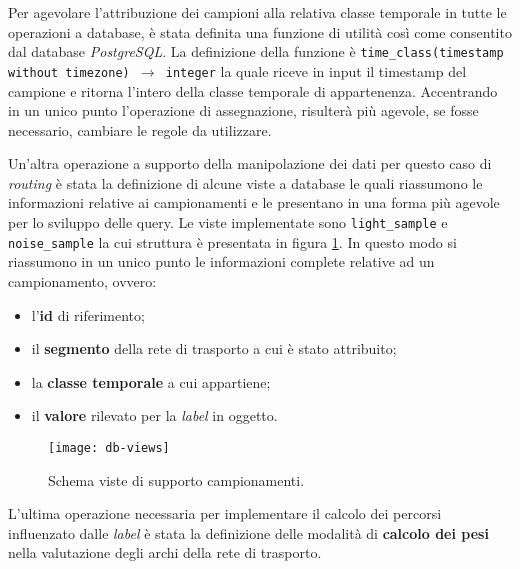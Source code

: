 Per agevolare l'attribuzione dei campioni alla relativa classe temporale in tutte le operazioni a database, è stata definita una funzione di utilità così come consentito dal database \emph{PostgreSQL}. La definizione della funzione è \texttt{time\_class(timestamp without timezone) $\rightarrow$ integer} la quale riceve in input il timestamp del campione e ritorna l'intero della classe temporale di appartenenza. Accentrando in un unico punto l'operazione di assegnazione, risulterà più agevole, se fosse necessario, cambiare le regole da utilizzare. 

Un'altra operazione a supporto della manipolazione dei dati per questo caso di \emph{routing} è stata la definizione di alcune viste a database le quali riassumono le informazioni relative ai campionamenti e le presentano in una forma più agevole per lo sviluppo delle query. Le viste implementate sono \texttt{light\_sample} e \texttt{noise\_sample} la cui struttura è presentata in figura \ref{fig:db-views}. In questo modo si riassumono in un unico punto le informazioni complete relative ad un campionamento, ovvero:
\begin{itemize}
\item l'\textbf{id} di riferimento;
\item il \textbf{segmento} della rete di trasporto a cui è stato attribuito;
\item la \textbf{classe temporale} a cui appartiene;
\item il \textbf{valore} rilevato per la \emph{label} in oggetto.
\end{itemize}

\begin{figure}[ht]
  \centering
  \texttt{[image: db-views]}
  \caption{\footnotesize{Schema viste di supporto campionamenti.}}
  \label{fig:db-views}
\end{figure}

L'ultima operazione necessaria per implementare il calcolo dei percorsi influenzato dalle \emph{label} è stata la definizione delle modalità di \textbf{calcolo dei pesi} nella valutazione degli archi della rete di trasporto.

